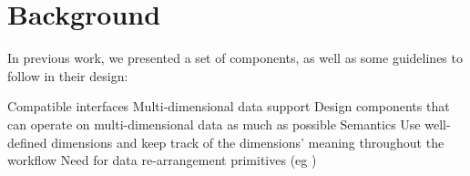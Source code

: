 \section{Background}
\label{s:background}
In previous work, we presented a set of \sys components, as well as some guidelines to follow in their design:
\begin{outline}
  \1 Compatible interfaces
  \1 Multi-dimensional data support
    \2 Design components that can operate on multi-dimensional data as much as possible
  \1 Semantics
    \2 Use well-defined dimensions and keep track of the dimensions' meaning throughout the workflow
  \1 Need for data re-arrangement primitives (eg \dimreduce)
\end{outline}
